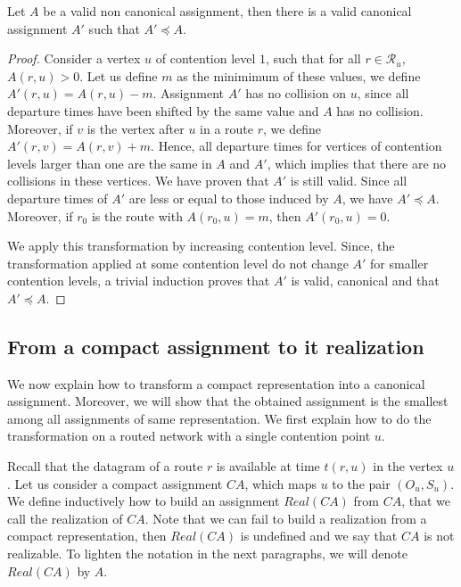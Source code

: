 \documentclass[english]{article}
\begin{document}
\begin{lemma}\label{lemma:canonical_min}
Let $A$ be a valid non canonical assignment, then there is a valid canonical assignment $A'$ such that $A' \preceq A$.
\end{lemma}
\begin{proof}
Consider a vertex $u$ of contention level $1$, such that for all $r \in \mathcal{R}_u$, $A(r,u) > 0$. Let us define $m$ as the minimimum of these values, we define $A'(r,u) = A(r,u) - m$. Assignment $A'$ has no collision on $u$, since all departure times have been shifted by the same value and $A$ has no collision. Moreover, if $v$ is the vertex after $u$ in a route $r$, we define  $A'(r,v) = A(r,v) + m$. Hence, all departure times for vertices of contention levels larger than one are the same in $A$ and $A'$, which implies that there are no collisions in these vertices. We have proven that $A'$ is still valid. Since all departure times of $A'$ are less or equal to those induced by $A$, we have $A' \preceq A$. Moreover, if $r_0$ is the route with $A(r_0,u) = m$, then $A'(r_0,u) = 0$. 

We apply this transformation by increasing contention level. Since, the transformation applied at some contention level do not change $A'$ for smaller contention levels, a trivial induction proves that $A'$ is valid, canonical and that $A' \preceq A$.
\end{proof}


\subsection{From a compact assignment to it realization}


We now explain how to transform a compact representation into a canonical assignment.
Moreover, we will show that the obtained assignment is the smallest among all assignments of same representation. We first explain how to do the transformation on a routed network with a single contention point $u$.

Recall that the datagram of a route $r$ is available at time $t(r,u)$ in the vertex $u$.
Let us consider a compact assignment $CA$, which maps $u$ to the pair $(O_u,S_u)$.
We define inductively how to build an assignment $Real(CA)$ from $CA$, that we call the realization of $CA$. Note that we can fail to build a realization from a compact representation, then $Real(CA)$ is undefined and we say that $CA$ is not realizable. To lighten the notation in the next paragraphs, we will denote $Real(CA)$ by $A$.
\end{document}
